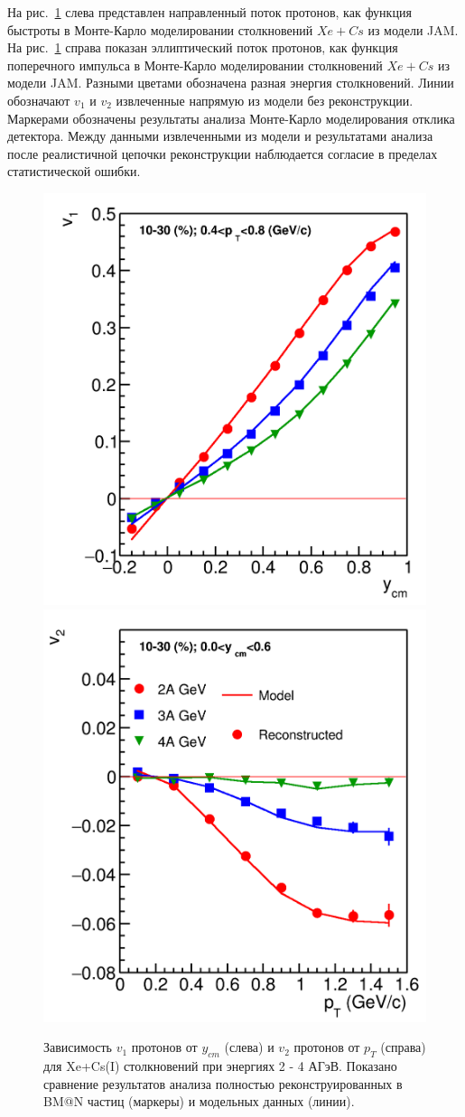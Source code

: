На рис.~\ref{fig:bmn_v1_v2} слева представлен направленный поток протонов, как функция быстроты в Монте-Карло моделировании столкновений $Xe+Cs$ из модели JAM. 
На рис.~\ref{fig:bmn_v1_v2} справа показан эллиптический поток протонов, как функция поперечного импульса в Монте-Карло моделировании столкновений $Xe+Cs$ из модели JAM. 
Разными цветами обозначена разная энергия столкновений. 
Линии обозначают $v_1$ и $v_2$ извлеченные напрямую из модели без реконструкции. 
Маркерами обозначены результаты анализа Монте-Карло моделирования отклика детектора.
Между данными извлеченными из модели и результатами анализа после реалистичной цепочки реконструкции наблюдается согласие в пределах статистической ошибки. 
%
\begin{figure}[h]
\begin{center}
\includegraphics[width=0.45\linewidth]{images/v1_proton_tof_rapidity.png}
\includegraphics[width=0.45\linewidth]{images/v2_proton_tof_pT.png}
\caption{ 
 Зависимость $v_1$ протонов от  $y_{cm}$ (слева) и $v_2$ протонов от $p_{T}$ (справа) для Xe+Cs(I)
столкновений при энергиях 2 - 4 АГэВ. 
Показано сравнение результатов анализа полностью реконструированных в BM@N частиц (маркеры) и модельных данных (линии).}
\label{fig:bmn_v1_v2}
\end{center}
\end{figure}

